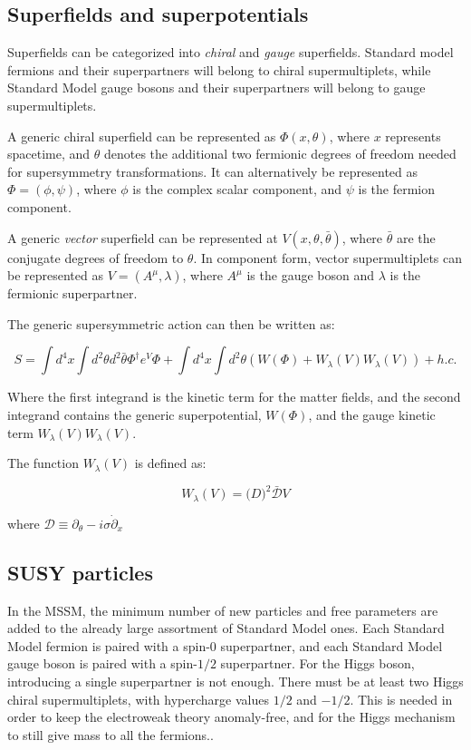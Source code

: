 \subsection{Superfields and superpotentials}\label{subsec:susy_superfields}
Superfields can be categorized into \textit{chiral} and \textit{gauge} superfields.
Standard model fermions and their superpartners will belong to chiral supermultiplets,
while Standard Model gauge bosons and their superpartners will belong to gauge supermultiplets.

A generic chiral superfield can be represented as $\Phi(x, \theta)$, where $x$ represents spacetime,
and $\theta$ denotes the additional two fermionic degrees of freedom needed for supersymmetry transformations.
It can alternatively be represented as $\Phi = \left(\phi, \psi \right)$, where $\phi$ is the complex scalar component,
and $\psi$ is the fermion component.

A generic \textit{vector} superfield can be represented at $V(x, \theta, \bar{\theta})$,
where $\bar{\theta}$ are the conjugate degrees of freedom to $\theta$.
In component form, vector supermultiplets can be represented as $V = \left(A^{\mu}, \lambda\right)$,
where $A^{\mu}$ is the gauge boson and $\lambda$ is the fermionic superpartner.

The generic supersymmetric action can then be written as:

\begin{equation}\label{eq:susy_action}
    S = \int d^4 x \int d^2 \theta d^2 \bar{\theta} \Phi^{\dagger} e^V \Phi
        + \int d^4 x \int d^2 \theta \left(W(\Phi) + W_{\lambda}(V)W_{\lambda}(V)\right)+h.c.
\end{equation}\cite{susy-unification-1998}

Where the first integrand is the kinetic term for the matter fields,
and the second integrand contains the generic superpotential, $W(\Phi)$,
and the gauge kinetic term $W_{\lambda}(V)W_{\lambda}(V)$.

The function $W_{\lambda}(V)$ is defined as:

\begin{equation}\label{eq:susy_gauge_potential}
    W_{\lambda}(V) = \mathcal(D)^{2}\bar{\mathcal{D}}V
\end{equation}

where $\mathcal{D} \equiv \partial_{\theta}-i\sigma\dot \partial_x$\cite{susy-unification-1998}

\subsection{SUSY particles}\label{subsec:susy_mssm}
In the MSSM, the minimum number of new particles and free parameters are added to the already large assortment of Standard Model ones.
Each Standard Model fermion is paired with a spin-$0$ superpartner, and each Standard Model gauge boson is paired with a spin-$1/2$ superpartner.
For the Higgs boson, introducing a single superpartner is not enough.
There must be at least two Higgs chiral supermultiplets, with hypercharge values $1/2$ and $-1/2$.
This is needed in order to keep the electroweak theory anomaly-free, and for the Higgs mechanism to still give mass to all the fermions.\cite{susy-primer-1998}.

